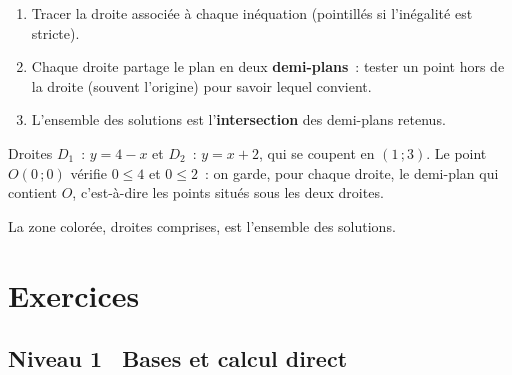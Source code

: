 \begin{methode}
\begin{enumerate}
  \item Tracer la droite associ\'ee \`a chaque in\'equation (pointill\'es si
        l'in\'egalit\'e est stricte).
  \item Chaque droite partage le plan en deux \textbf{demi-plans}~: tester un point
        hors de la droite (souvent l'origine) pour savoir lequel convient.
  \item L'ensemble des solutions est l'\textbf{intersection} des demi-plans retenus.
\end{enumerate}
\end{methode}

\begin{ex}
Droites $D_1$~: $y=4-x$ et $D_2$~: $y=x+2$, qui se coupent en $(1\,;3)$.
Le point $O(0\,;0)$ v\'erifie $0\leq4$ et $0\leq2$~: on garde, pour chaque droite,
le demi-plan qui contient $O$, c'est-\`a-dire les points situ\'es sous les deux droites.
\begin{center}
\end{center}
La zone color\'ee, droites comprises, est l'ensemble des solutions.
\end{ex}

\section{Exercices}

\subsection*{\quad Niveau 1 \textemdash\ Bases et calcul direct}

